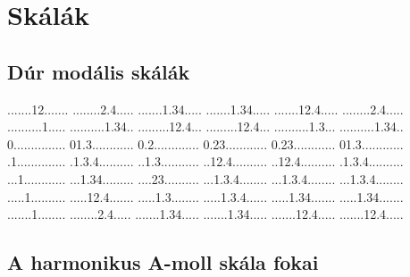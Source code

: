 \documentclass[a4paper,11pt]{article}
\begin{document}
\section{Skálák}

\subsection{Dúr modális skálák}

          {.......12.......%
           ........2.4.....%
           .......1.34.....%
           .......1.34.....%
           .......12.4.....%
           ........2.4.....}
          {..........1.....%
           ..........1.34..%
           .........12.4...%
           .........12.4...%
           ..........1.3...%
           ..........1.34..}
          {0...............%
           01.3............%
           0.2.............%
           0.23............%
           0.23............%
           01.3............}         
          {.1..............%
           .1.3.4..........%
           ..1.3...........%
           ..12.4..........%
           ..12.4..........%
           .1.3.4..........} 
          {...1............%
           ...1.34.........%
           ....23..........%
           ...1.3.4........%
           ...1.3.4........%
           ...1.3.4........} 
          {.....1..........%
           .....12.4.......%
           .....1.3........%
           .....1.3.4......%
           .....1.34.......%
           .....1.34.......} 
          {.......1........%
           ........2.4.....%
           .......1.34.....%
           .......1.34.....%
           .......12.4.....%
           .......12.4.....} 
\newpage

\subsection{A harmonikus A-moll skála fokai}
\end{document}
